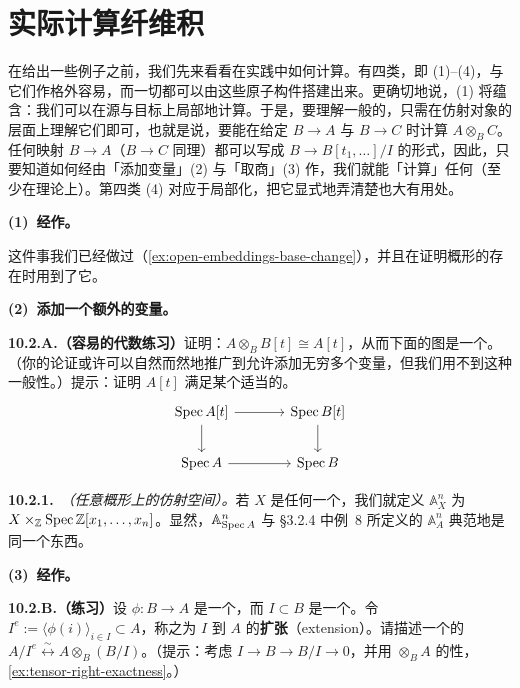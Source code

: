 
\section{实际计算纤维积}

在给出一些例子之前，我们先来看看在实践中如何计算\trFiberProduct。有四类\trMorphism{}，即 (1)--(4)，与它们作\trFiberProduct{}格外容易，而一切\trMorphism{}都可以由这些原子构件搭建出来。更确切地说，(1) 将蕴含：我们可以在源与目标上局部地计算\trFiberProduct。于是，要理解一般的\trFiberProduct，只需在仿射对象的层面上理解它们即可，也就是说，要能在给定\trRingMorphism{} $B\to A$ 与 $B\to C$ 时计算 $A\otimes_B C$。任何映射 $B\to A$（$B\to C$ 同理）都可以写成 $B\to B[t_1,\dots]/I$ 的形式，因此，只要知道如何经由「添加变量」(2) 与「取商」(3) 作\trBaseChange，我们就能「计算」任何\trFiberProduct（至少在理论上）。第四类\trMorphism{} (4) 对应于局部化，把它显式地弄清楚也大有用处。

\textbf{(1)~经\trOpenEmbedding{}作\trBaseChange。}

这件事我们已经做过（\cref{ex:open-embeddings-base-change}），并且在证明概形的\trFiberProduct{}存在时用到了它。

\textbf{(2)~添加一个额外的变量。}

\textbf{10.2.A.（容易的代数练习）}\quad 证明：$A\otimes_B B[t]\cong A[t]$，从而下面的图是一个\trCartesianDiagram。（你的论证或许可以自然而然地推广到允许添加无穷多个变量，但我们用不到这种一般性。）提示：证明 $A[t]$ 满足某个适当的\trUniversalProperty。
\[
\begin{tikzcd}[row sep=2em, column sep=3.6em]
\Spec A[t] \ar[r] \ar[d] & \Spec B[t] \ar[d] \\
\Spec A \ar[r] & \Spec B
\end{tikzcd}
\]

\textbf{10.2.1.}\ \emph{\trhDefinition{}（任意概形上的仿射空间）。}\quad 若 $X$ 是任何一个\trScheme，我们就定义 $\mathbb{A}^n_X$ 为 $X\times_{\mathbb{Z}}\operatorname{Spec}\mathbb{Z}[x_1,\dots,x_n]$。显然，$\mathbb{A}^n_{\operatorname{Spec} A}$ 与 \S3.2.4 中例~8 所定义的 $\mathbb{A}^n_A$ 典范地是同一个东西。

\textbf{(3)~经\trClosedEmbedding{}作\trBaseChange。}

\textbf{10.2.B.（练习）}\quad 设 $\phi\colon B\to A$ 是一个\trRingMorphism，而 $I\subset B$ 是一个\trIdeal。令 $I^e:=\langle\phi(i)\rangle_{i\in I}\subset A$，称之为 $I$ 到 $A$ 的\textbf{扩张}（extension）。请描述一个\trNatural{}的\trIsomorphism{} $A/I^e\overset{\sim}{\longleftrightarrow}A\otimes_B(B/I)$。（提示：考虑 $I\to B\to B/I\to 0$，并用 $\otimes_B A$ 的\trRightExact{}性，\cref{ex:tensor-right-exactness}。）

